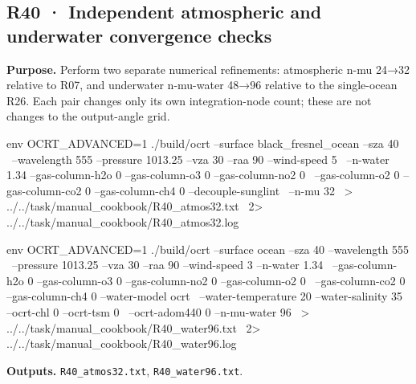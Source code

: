 
\subsection{R40 · Independent atmospheric and underwater convergence checks}
\label{sec:auto:09_cookbook:7.3}

\label{recipe:R40}

\textbf{Purpose. }Perform two separate numerical refinements: atmospheric n-mu 24→32 relative to R07, and underwater n-mu-water 48→96 relative to the single-ocean R26. Each pair changes only its own integration-node count; these are not changes to the output-angle grid.

\noindent\begin{minipage}{\linewidth}
\begin{ManualCode}

env OCRT_ADVANCED=1 ./build/ocrt --surface black_fresnel_ocean --sza 40 \
  --wavelength 555 --pressure 1013.25 --vza 30 --raa 90 --wind-speed 5 \
  --n-water 1.34 --gas-column-h2o 0 --gas-column-o3 0 --gas-column-no2 0 \
  --gas-column-o2 0 --gas-column-co2 0 --gas-column-ch4 0 --decouple-sunglint \
  --n-mu 32 \
  > ../../task/manual_cookbook/R40_atmos32.txt \
  2> ../../task/manual_cookbook/R40_atmos32.log

\end{ManualCode}
\end{minipage}\par

\noindent\begin{minipage}{\linewidth}
\begin{ManualCode}

env OCRT_ADVANCED=1 ./build/ocrt --surface ocean --sza 40 --wavelength 555 \
  --pressure 1013.25 --vza 30 --raa 90 --wind-speed 3 --n-water 1.34 \
  --gas-column-h2o 0 --gas-column-o3 0 --gas-column-no2 0 --gas-column-o2 0 \
  --gas-column-co2 0 --gas-column-ch4 0 --water-model ocrt \
  --water-temperature 20 --water-salinity 35 --ocrt-chl 0 --ocrt-tsm 0 \
  --ocrt-adom440 0 --n-mu-water 96 \
  > ../../task/manual_cookbook/R40_water96.txt \
  2> ../../task/manual_cookbook/R40_water96.log

\end{ManualCode}
\end{minipage}\par

\textbf{Outputs. }\texttt{R40\_\allowbreak{}atmos32.txt}, \texttt{R40\_\allowbreak{}water96.txt}.

